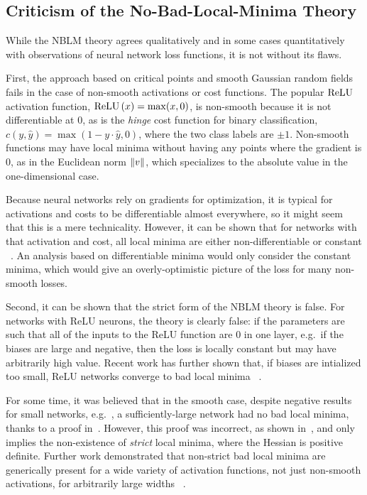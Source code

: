 \documentclass[../../thesis.tex]{subfiles}
\begin{document}
\subsection{Criticism of the No-Bad-Local-Minima Theory}

While the NBLM theory agrees qualitatively and in some cases quantitatively
with observations of neural network loss functions,
it is not without its flaws.

First, the approach based on critical points
and smooth Gaussian random fields fails
in the case of non-smooth activations or cost functions.
The popular $\mathrm{ReLU}$ activation function,
$\mathrm{ReLU}\left(x\right) = \max(x, 0)$,
is non-smooth because it is not differentiable at $0$,
as is the \emph{hinge} cost function for binary classification,
$c(y, \hat{y}) = \max(1-y\cdot\hat{y}, 0)$,
where the two class labels are $\pm 1$.
Non-smooth functions may have local minima
without having any points where the gradient is $0$,
as in the Euclidean norm $\lVert v\rVert$,
which specializes to the absolute value in the one-dimensional case.

Because neural networks rely on gradients for optimization,
it is typical for activations and costs
to be differentiable almost everywhere,
so it might seem that this is a mere technicality.
However, it can be shown that for networks
with that activation and cost,
all local minima are either non-differentiable or constant%
~\cite{laurent2017}.
An analysis based on differentiable minima would only
consider the constant minima,
which would give an overly-optimistic picture
of the loss for many non-smooth losses.

Second,
it can be shown that the strict form of the NBLM theory is false.
For networks with ReLU neurons, the theory is clearly false:
if the parameters are such that all of the inputs to the
ReLU function are $0$ in one layer,
e.g.~if the biases are large and negative,
then the loss is locally constant
but may have arbitrarily high value.
Recent work has further shown that,
if biases are intialized too small,
ReLU networks converge to bad local minima%
~\cite{holzmller2020}.

For some time, it was believed that in the smooth case,
despite negative results for small networks,
e.g.~\cite{auer1996},
a sufficiently-large network had
no bad local minima,
thanks to a proof in~\cite{yu1995}.
However, this proof was incorrect,
as shown in~\cite{li2018},
and only implies the non-existence of
\emph{strict} local minima,
where the Hessian is positive definite.
Further work demonstrated that non-strict bad local minima
are generically present for a wide variety of activation functions,
not just non-smooth activations,
for arbitrarily large widths%
~\cite{ding2019}.
\end{document}
